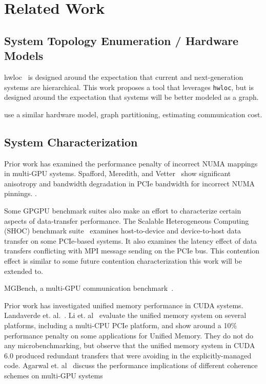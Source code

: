 \chapter{Related Work}
\label{ch:related}


\section{System Topology Enumeration / Hardware Models}

hwloc~\cite{broquedis2010hwloc} is designed around the expectation that current and next-generation systems are hierarchical.
This work proposes a tool that leverages \texttt{hwloc}, but is designed around the expectation that systems will be better modeled as a graph.

\cite{amaral2017topology} use a similar hardware model, graph partitioning, estimating communication cost.

\section{System Characterization}

Prior work has examined the performance penalty of incorrect NUMA mappings in multi-GPU systems.
Spafford, Meredith, and Vetter~\cite{spafford2011quantifying} show significant anisotropy and bandwidth degradation in PCIe bandwidth for incorrect NUMA pinnings. .


Some GPGPU benchmark suites also make an effort to characterize certain aspects of data-transfer performance.
The Scalable Heterogeneous Computing (SHOC) benchmark suite~\cite{danalis2010scalable} examines host-to-device and device-to-host data transfer on some PCIe-based systems.
It also examines the latency effect of data transfers conflicting with MPI message sending on the PCIe bus.
This contention effect is similar to some future contention characterization this work will be extended to.


MGBench, a multi-GPU communication benchmark~\cite{bennun2016mgbench}.


Prior work has investigated unified memory performance in CUDA systems.
Landaverde et. al.~\cite{landaverde2014investigation}.
Li et. al~\cite{li2015evaluation} evaluate the unified memory system on several platforms, including a multi-CPU PCIe platform, and show around a 10\% performance penalty on some applications for Unified Memory.
They do not do any microbenchmarking, but observe that the unified memory system in CUDA 6.0 produced redundant transfers that were avoiding in the explicitly-managed code.
Agarwal et. al~\cite{agarwal2015unlocking} discuss the performance implications of different coherence schemes on multi-GPU systems

